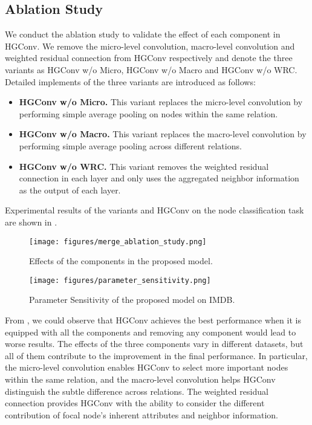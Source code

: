 \subsection{Ablation Study}
We conduct the ablation study to validate the effect of each component in HGConv. We remove the micro-level convolution, macro-level convolution and weighted residual connection from HGConv respectively and denote the three variants as HGConv w/o Micro, HGConv w/o Macro and HGConv w/o WRC. 
Detailed implements of the three variants are introduced as follows:
\begin{itemize}
    \item \textbf{HGConv w/o Micro.}
    This variant replaces the micro-level convolution by performing simple average pooling on nodes within the same relation. 
    \item \textbf{HGConv w/o Macro.}
    This variant replaces the macro-level convolution by performing simple average pooling across different relations.
    \item \textbf{HGConv w/o WRC.}
    This variant removes the weighted residual connection in each layer and only uses the aggregated neighbor information as the output of each layer.
\end{itemize}
Experimental results of the variants and HGConv on the node classification task are shown in .
\begin{figure}[!htbp]
    \centering
    \texttt{[image: figures/merge\_ablation\_study.png]}    
    \caption{Effects of the components in the proposed model.}
    \label{fig:ablation_study}
\end{figure}

\begin{figure*}[t]
    \centering
    \texttt{[image: figures/parameter\_sensitivity.png]}    
    \caption{Parameter Sensitivity of the proposed model on IMDB.}
    \label{fig:parameter_sensitivity}
\end{figure*}

From , we could observe that HGConv achieves the best performance when it is equipped with all the components and removing any component would lead to worse results. The effects of the three components vary in different datasets, but all of them contribute to the improvement in the final performance. In particular, the micro-level convolution enables HGConv to select more important nodes within the same relation, and the macro-level convolution helps HGConv distinguish the subtle difference across relations. The weighted residual connection provides HGConv with the ability to consider the different contribution of focal node's inherent attributes and neighbor information. 

